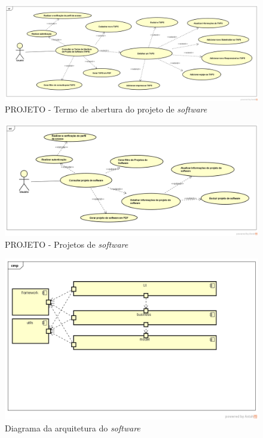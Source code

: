 \documentclass{acm_proc_article-sp}
\begin{document}
\begin{figure}[h]
\centering %
\includegraphics[width=1\textwidth]{TAP.png} %
\caption{PROJETO - Termo de abertura do projeto de  \textit{software}}
\end{figure}

\begin{figure}[h]
\centering %
\includegraphics[width=1\textwidth]{Consulta_de_Projeto.png} %
\caption{PROJETO - Projetos de  \textit{software}}
\end{figure}

\begin{figure}[h]
\centering %
\includegraphics[width=1\textwidth]{ArquiteturaDoProjeto.png} %
\caption{Diagrama da arquitetura do \textit{software}}
\end{figure}
\end{document}
